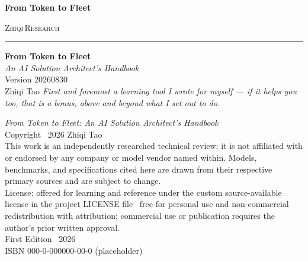 
\thispagestyle{empty}
\begin{center}
  \vspace*{5.5cm}
  {\huge\bfseries From Token to Fleet}
\end{center}
\clearpage

\thispagestyle{empty}
\begin{center}
  \vspace*{1.0cm}
  {\large\scshape Zhiqi\,Research}
  \vspace{0.3cm}
  \rule{0.42\textwidth}{0.4pt}
  \vspace{3.6cm}
  {\Huge\bfseries From Token to Fleet}\\[1.0cm]
  {\Large\itshape An AI Solution Architect's Handbook}\\
  \vspace{0.8cm}
  {\normalsize Version 20260830}\\
  \vspace{5.0cm}
  {\large Zhiqi Tao}
  \vfill
  {\small\itshape First and foremost a learning tool I wrote for myself ---
  if it helps you too, that is a bonus, above and beyond what I set out to do.}
\end{center}
\clearpage

\thispagestyle{empty}
\setlength{\parindent}{0pt}
\vspace*{2.2cm}
{\large\itshape From Token to Fleet: An AI Solution Architect's Handbook}\\[1.0em]
Copyright \textcopyright\ 2026 Zhiqi Tao\\[1.4em]
{\small
This work is an independently researched technical review;
it is not affiliated with or endorsed by any company or model vendor named
within. Models, benchmarks, and specifications cited here are drawn from their
respective primary sources and are subject to change.\\[1.2em]
License: offered for learning and reference under the custom source-available
license in the project LICENSE file \textemdash\ free for personal use and
non-commercial redistribution with attribution; commercial use or publication
requires the author's prior written approval.\\[2.0em]
First Edition \textbullet\ 2026\\
ISBN 000-0-000000-00-0 (placeholder)}
\clearpage
